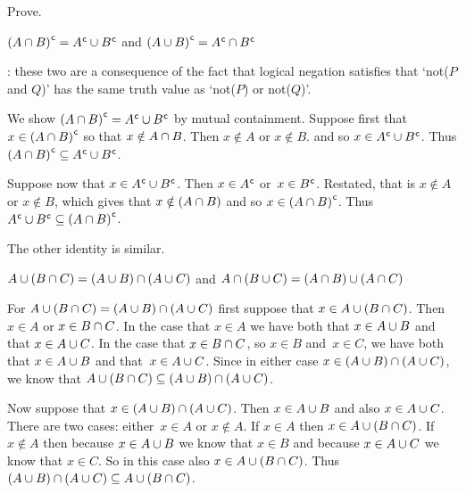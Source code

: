 \documentclass{ibl}  %
\begin{document}
\begin{problem}
  Prove.
\begin{exes}
\begin{exercise} 
  ${(A\cap B)}^{\mspace{1mu}\mathsf{c}}={A}^{\mspace{1mu}\mathsf{c}}\cup{B}^{\mspace{1mu}\mathsf{c}}$
  and
  ${(A\cup B)}^{\mspace{1mu}\mathsf{c}}={A}^{\mspace{1mu}\mathsf{c}}\cap{B}^{\mspace{1mu}\mathsf{c}}$ 
\end{exercise}
\begin{answer}
  \remark: these two are a consequence of the fact that logical negation
  satisfies that `not($P$ and $Q$)' has the same truth value as
  `not($P$) or not($Q$)'.

  We show  ${(A\cap B)}^{\mspace{1mu}\mathsf{c}}={A}^{\mspace{1mu}\mathsf{c}}\cup{B}^{\mspace{1mu}\mathsf{c}}$
  by mutual containment.
  Suppose first that $x\in {(A\cap B)}^{\mspace{1mu}\mathsf{c}}$ so that
  $x\notin A\cap B$.
  Then $x\notin A$ or $x\notin B$.
  and so $x\in {A}^{\mspace{1mu}\mathsf{c}}\cup{B}^{\mspace{1mu}\mathsf{c}}$.
  Thus ${(A\cap B)}^{\mspace{1mu}\mathsf{c}}\subseteq{A}^{\mspace{1mu}\mathsf{c}}\cup{B}^{\mspace{1mu}\mathsf{c}}$.

  Suppose now that $x\in {A}^{\mspace{1mu}\mathsf{c}}\cup{B}^{\mspace{1mu}\mathsf{c}}$.
  Then $x\in{A}^{\mspace{1mu}\mathsf{c}}$ or~$x\in{B}^{\mspace{1mu}\mathsf{c}}$.
  Restated, that is $x\notin A$ or $x\notin B$,
  which gives that $x\notin (A\cap B)$ and
  so $x\in{(A\cap B)}^{\mspace{1mu}\mathsf{c}}$.
  Thus ${A}^{\mspace{1mu}\mathsf{c}}\cup{B}^{\mspace{1mu}\mathsf{c}}\subseteq{(A\cap B)}^{\mspace{1mu}\mathsf{c}}$.
  
  The other identity is similar.  
\end{answer}
\begin{exercise}  
  $A\cup (B\cap C)=(A\cup B)\cap (A\cup C)$
  and 
  $A\cap (B\cup C)=(A\cap B)\cup (A\cap C)$
\end{exercise}
\begin{answer}
  For $A\cup (B\cap C)=(A\cup B)\cap (A\cup C)$
  first suppose that $x\in A\cup (B\cap C)$.
  Then $x\in A$ or $x\in B\cap C$.
  In the case that $x\in A$ we have both that $x\in A\cup B$ and that
  $x\in A\cup C$.
  In the case that $x\in B\cap C$, so $x\in B$ and~$x\in C$, 
  we have both that $x\in A\cup B$ and that~$x\in A\cup C$.
  Since in either case $x\in (A\cup B)\cap (A\cup C)$,
  we know that 
  $A\cup (B\cap C)\subseteq (A\cup B)\cap (A\cup C)$.

  Now suppose that $x\in (A\cup B)\cap (A\cup C)$.
  Then $x\in A\cup B$ and also $x\in A\cup C$.
  There are two cases: either~$x\in A$ or $x\notin A$.
  If $x\in A$ then $x\in A\cup (B\cap C)$.
  If $x\notin A$ then because $x\in A\cup B$ we know that $x\in B$
  and because $x\in A\cup C$ we know that $x\in C$.
  So in this case also $x\in A\cup (B\cap C)$.
  Thus 
  $(A\cup B)\cap (A\cup C)\subseteq A\cup (B\cap C)$.


\end{answer}
\end{exes}
\end{problem}
\end{document}
